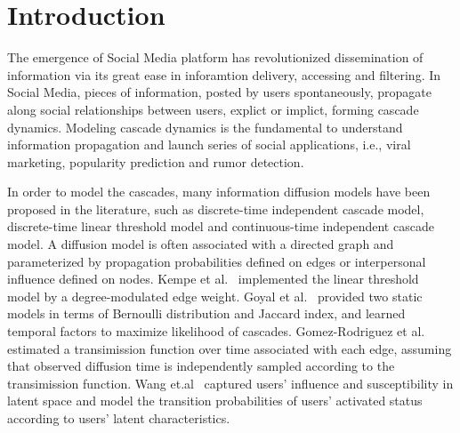 \section{Introduction}

The emergence of Social Media platform has revolutionized dissemination of
information via its great ease in inforamtion delivery, accessing and filtering. 
In Social Media, pieces of information, posted by users spontaneously, propagate
along social relationships between users, explict or implict, forming cascade dynamics.
Modeling cascade dynamics is the fundamental to understand information
propagation and launch series of social applications, i.e., viral marketing,
popularity prediction and rumor detection. 

In order to model the cascades, many information diffusion models have been
proposed in the literature, such as discrete-time independent cascade model,
discrete-time linear threshold model and continuous-time independent cascade
model. A diffusion model is often associated with a directed graph and 
parameterized by propagation probabilities defined on edges or interpersonal
influence defined on nodes.
Kempe et al.~\cite{kempe2003maximizing} implemented
the linear threshold model by a degree-modulated edge weight. Goyal et
al.~\cite{goyal2010learning} provided two static models in terms of Bernoulli
distribution and Jaccard index, and learned temporal factors to maximize
likelihood of cascades. Gomez-Rodriguez et al.~\cite{gomez2013modeling}
estimated a transimission function over time associated with each edge, assuming
that observed diffusion time is independently sampled according to the
transimission function. Wang et.al~\cite{WangAAAI15}
captured users' influence and susceptibility in latent space and model the
transition probabilities of users' activated status according to users' latent
characteristics.

% 
% 
% 

